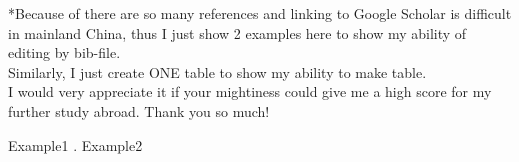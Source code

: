 \documentclass[review]{elsarticle}
\begin{document}
*Because of there are so many references and linking to Google Scholar is difficult in mainland China, thus I just show 2 examples here to show my ability of editing by bib-file.
\\
Similarly, I just create ONE table to show my ability to make table.
\\
I would very appreciate it if your mightiness could give me a high score for my further study abroad. Thank you so much!

 Example1 \cite{Feynman1963118,Dirac1953888}.
 Example2 \cite{besse2002apparent}



\end{document}

